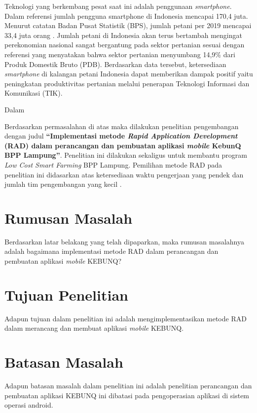 \begin{flushleft}
\begin{justify}
    Teknologi yang berkembang pesat saat ini adalah penggunaan \textit{smartphone}. Dalam referensi \cite{web-datasmartphone} 
    jumlah pengguna smartphone di Indonesia mencapai 170,4 juta. Menurut catatan Badan Pusat Statistik (BPS), jumlah petani per 2019 mencapai 33,4 juta orang \cite{databps}. 
    Jumlah petani di Indonesia akan terus bertambah mengingat perekonomian nasional sangat bergantung pada sektor pertanian sesuai dengan 
    referensi \cite{jurnal-kajianAplikasi} yang menyatakan bahwa sektor pertanian menyumbang 14,9\% dari Produk Domestik Bruto (PDB). Berdasarkan data tersebut, ketersediaan \textit{smartphone} di kalangan petani Indonesia dapat memberikan dampak positif yaitu peningkatan produktivitas pertanian melalui penerapan Teknologi Informasi dan  Komunikasi (TIK). 

    Dalam 
    
    Berdasarkan permasalahan di atas maka dilakukan penelitian pengembangan dengan judul \textbf{“Implementasi metode \textit{Rapid Application Development} (RAD) dalam perancangan dan pembuatan aplikasi \textit{mobile} KebunQ BPP Lampung”}.  Penelitian ini dilakukan sekaligus untuk membantu program \textit{Low Cost Smart Farming} BPP Lampung. Pemilihan metode RAD pada penelitian ini didasarkan atas ketersediaan waktu pengerjaan yang pendek \cite{Sukamto} dan jumlah tim pengembangan yang kecil \cite{jurnal empiris}.
\\

    \section{Rumusan Masalah}
      Berdasarkan latar belakang yang telah dipaparkan, maka rumusan masalahnya adalah bagaimana implementasi metode RAD dalam perancangan dan pembuatan aplikasi \textit{mobile} KEBUNQ?
      \\
    \section{Tujuan Penelitian}
      Adapun tujuan dalam penelitian ini adalah mengimplementasikan metode RAD dalam merancang dan membuat aplikasi \textit{mobile} KEBUNQ.
      \\
    \section{Batasan Masalah}
      Adapun batasan masalah dalam penelitian ini adalah penelitian perancangan dan pembuatan aplikasi KEBUNQ ini dibatasi pada pengoperasian aplikasi di sistem operasi android.
      \\

\end{justify}
\end{flushleft}
